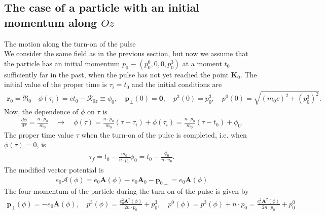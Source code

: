 \subsection{The case of a particle with an initial momentum along $O z$}
The motion along the turn-on of the pulse\\
We consider the same field as in the previous section, but now we assume that the particle has an initial momentum $p_{0} \equiv\left(p_{0}^{0}, 0,0, p_{0}^{3}\right)$ at a moment $t_{0}$ sufficiently far in the past, when the pulse has not yet reached the point $\boldsymbol{K}_{0}$. The initial value of the proper time is $\tau_{i}=t_{0}$ and the initial conditions are
\begin{align}
  \mathbf{r}_{0}=\boldsymbol{\mathfrak {R}}_{0} \quad \phi\left(\tau_{i}\right)=c t_{0}-\mathcal{R}_{0 z}\equiv \phi_{0}, \quad \mathbf{p}_{\perp}(0)=\mathbf{0}, \quad p^{3}(0)=p_{0}^{3}, \quad p^{0}(0)=\sqrt{\left(m_{0} c\right)^{2}+\left(p_{0}^{3}\right)^{2}} . \label{II.2.5.1}
\end{align}
Now, the dependence of $\phi$ on $\tau$ is
\begin{align}
  \frac{d \phi}{d \tau}=\frac{n \cdot p_{0}}{m_{0}} \quad \longrightarrow \quad \phi(\tau)=\frac{n \cdot p_{0}}{m_{0}}\left(\tau-\tau_{i}\right)+\phi\left(\tau_{i}\right)=\frac{n \cdot p_{0}}{m_{0}}\left(\tau-t_{0}\right)+\phi_{0} . \label{II.2.5.2}
\end{align}
The proper time value  $\tau$ when the turn-on of the pulse is completed, i.e. when $\phi(\tau)=0$, is
\begin{align}
  \tau_{f}=t_{0}-\frac{m_{0}}{n \cdot p_{0}} \phi_{0}=t_{0}-\frac{\phi_{0}}{n \cdot u_{0}} . \label{II.2.5.3}
\end{align}
The modified vector potential is
\begin{align}
  e_{0} \boldsymbol{\mathcal{A}}(\phi)=e_{0} \mathbf{A}(\phi)-e_{0} \mathbf{A}_{0}-\mathbf{p}_{0 \perp}=e_{0} \mathbf{A}(\phi) \label{II.2.5.4}
\end{align}
The four-momentum of the particle during the turn-on of the pulse is given by
\begin{align}
  \mathbf{p}_{\perp}(\phi)=-e_{0} \mathbf{A}(\phi), \quad p^{3}(\phi)=\frac{e_{0}^{2} \mathbf{A}^{2}(\phi)}{2 n \cdot p_{0}}+p_{0}^{3}, \quad p^{0}(\phi)=p^{3}(\phi)+n \cdot p_{0}=\frac{e_{0}^{2} \mathbf{A}^{2}(\phi)}{2 n \cdot p_{0}}+p_{0}^{0} \label{II.2.5.5}
\end{align}


